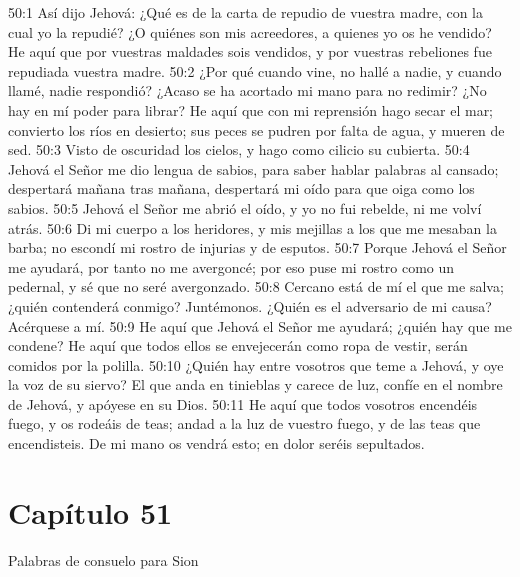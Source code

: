 50:1 Así dijo Jehová: ¿Qué es de la carta de repudio de vuestra madre, con la cual yo la repudié? ¿O quiénes son mis acreedores, a quienes yo os he vendido? He aquí que por vuestras maldades sois vendidos, y por vuestras rebeliones fue repudiada vuestra madre. 
50:2 ¿Por qué cuando vine, no hallé a nadie, y cuando llamé, nadie respondió? ¿Acaso se ha acortado mi mano para no redimir? ¿No hay en mí poder para librar? He aquí que con mi reprensión hago secar el mar; convierto los ríos en desierto; sus peces se pudren por falta de agua, y mueren de sed. 
50:3 Visto de oscuridad los cielos, y hago como cilicio su cubierta. 
50:4 Jehová el Señor me dio lengua de sabios, para saber hablar palabras al cansado; despertará mañana tras mañana, despertará mi oído para que oiga como los sabios. 
50:5 Jehová el Señor me abrió el oído, y yo no fui rebelde, ni me volví atrás. 
50:6 Di mi cuerpo a los heridores, y mis mejillas a los que me mesaban la barba; no escondí mi rostro de injurias y de esputos. 
50:7 Porque Jehová el Señor me ayudará, por tanto no me avergoncé; por eso puse mi rostro como un pedernal, y sé que no seré avergonzado. 
50:8 Cercano está de mí el que me salva; ¿quién contenderá conmigo? Juntémonos. ¿Quién es el adversario de mi causa? Acérquese a mí. 
50:9 He aquí que Jehová el Señor me ayudará; ¿quién hay que me condene? He aquí que todos ellos se envejecerán como ropa de vestir, serán comidos por la polilla. 
50:10 ¿Quién hay entre vosotros que teme a Jehová, y oye la voz de su siervo? El que anda en tinieblas y carece de luz, confíe en el nombre de Jehová, y apóyese en su Dios. 
50:11 He aquí que todos vosotros encendéis fuego, y os rodeáis de teas; andad a la luz de vuestro fuego, y de las teas que encendisteis. De mi mano os vendrá esto; en dolor seréis sepultados. 
\section*{Capítulo 51 }
Palabras de consuelo para Sion 
 
